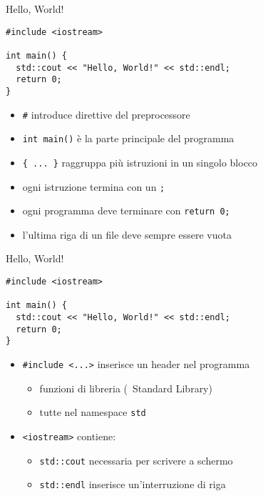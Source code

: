 \begin{frame}[fragile]{Hello, World!}
  \vfill
  \begin{lstlisting}
#include <iostream>

int main() {
  std::cout << "Hello, World!" << std::endl;
  return 0;
}
  \end{lstlisting}
  \vfill
  \begin{itemize}
    \item \lstinline$#$ introduce direttive del preprocessore
    \vfill
    \item \lstinline$int main()$ è la parte principale del programma
    \vfill
    \item \lstinline${ ... }$ raggruppa più istruzioni in un singolo blocco
    \vfill
    \item ogni istruzione termina con un \lstinline$;$
    \vfill
    \item ogni programma deve terminare con \lstinline$return 0;$
    \vfill
    \item l'ultima riga di un file deve sempre essere vuota
  \end{itemize}
  \vfill
\end{frame}

\begin{frame}[fragile]{Hello, World!}
  \vfill
  \begin{lstlisting}
#include <iostream>

int main() {
  std::cout << "Hello, World!" << std::endl;
  return 0;
}
  \end{lstlisting}
  \vfill
  \begin{itemize}
    \item \lstinline$#include <...>$ inserisce un \alert{header} nel programma
    \begin{itemize}
      \item funzioni di libreria (\CC\ Standard Library)
      \item tutte nel \alert{namespace} \lstinline$std$
    \end{itemize}
    \vfill
    \item \lstinline$<iostream>$ contiene:
    \begin{itemize}
      \item \lstinline$std::cout$ necessaria per scrivere a schermo
      \item \lstinline$std::endl$ inserisce un'interruzione di riga
    \end{itemize}
  \end{itemize}
  \vfill
\end{frame}

